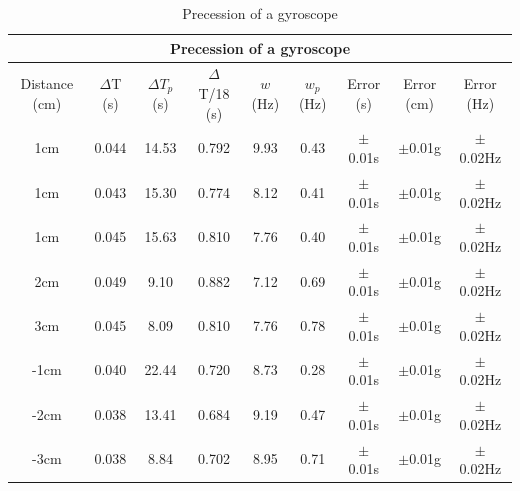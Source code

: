 \documentclass[12pt]{article}
\begin{document}
\begin{table}[H]
\begin{center}
 \footnotesize
 \begin{tabular}{|c||c|c|c|c|c|c|c|c|}
 \hline
 \multicolumn{9}{|c|}{Precession of a gyroscope} \\
 \hline \hline
 Distance (cm) & $\Delta$T (s) & $\Delta$$T_p$ (s) & $\Delta$T/18 (s) & $w$ (Hz) & $w_p$ (Hz) & Error (s) & Error (cm) & Error (Hz)\\
 \hline \hline
 1cm  & 0.044 & 14.53 & 0.792 & 9.93 & 0.43 & $\pm$0.01s & $\pm$0.01g & $\pm$0.02Hz\\
 \hline
 1cm  & 0.043 & 15.30 & 0.774 & 8.12 & 0.41 & $\pm$0.01s & $\pm$0.01g & $\pm$0.02Hz\\
 \hline
 1cm  & 0.045 & 15.63 & 0.810 & 7.76 & 0.40 & $\pm$0.01s & $\pm$0.01g & $\pm$0.02Hz \\
 \hline
 2cm  & 0.049 & 9.10 & 0.882 & 7.12 & 0.69 & $\pm$0.01s & $\pm$0.01g& $\pm$0.02Hz \\
 \hline
 3cm  & 0.045 & 8.09 & 0.810 & 7.76 & 0.78 & $\pm$0.01s & $\pm$0.01g & $\pm$0.02Hz\\
 \hline \hline
 -1cm  & 0.040 & 22.44 & 0.720 & 8.73 & 0.28 & $\pm$0.01s & $\pm$0.01g & $\pm$0.02Hz\\
 \hline
 -2cm  & 0.038 & 13.41 & 0.684 & 9.19 & 0.47 & $\pm$0.01s & $\pm$0.01g & $\pm$0.02Hz\\
 \hline
 -3cm  & 0.038 & 8.84 & 0.702 & 8.95 & 0.71 & $\pm$0.01s & $\pm$0.01g & $\pm$0.02Hz\\
 \hline
 \end{tabular}
 \caption{Precession of a gyroscope}
 \label{Precession of a gyroscope table}
\end{center}
\end{table}
\end{document}
